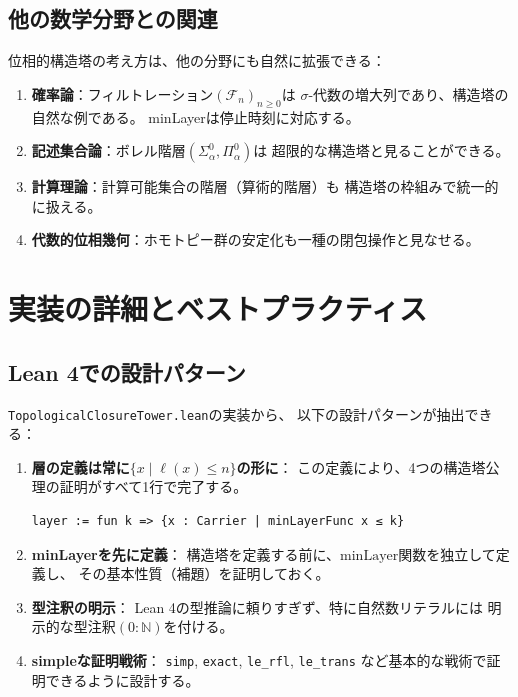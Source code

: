 \documentclass[a4paper,12pt]{ltjsarticle}
\theoremstyle{definition}
\begin{document}
\subsection{他の数学分野との関連}

位相的構造塔の考え方は、他の分野にも自然に拡張できる：

\begin{enumerate}
\item \textbf{確率論}：フィルトレーション$(\mathcal{F}_n)_{n \geq 0}$は
  $\sigma$-代数の増大列であり、構造塔の自然な例である。
  minLayerは停止時刻に対応する。

\item \textbf{記述集合論}：ボレル階層$(\Sigma^0_\alpha, \Pi^0_\alpha)$は
  超限的な構造塔と見ることができる。

\item \textbf{計算理論}：計算可能集合の階層（算術的階層）も
  構造塔の枠組みで統一的に扱える。

\item \textbf{代数的位相幾何}：ホモトピー群の安定化も一種の閉包操作と見なせる。
\end{enumerate}

\section{実装の詳細とベストプラクティス}

\subsection{Lean 4での設計パターン}

\texttt{TopologicalClosureTower.lean}の実装から、
以下の設計パターンが抽出できる：

\begin{enumerate}
\item \textbf{層の定義は常に}$\{x \mid \ell(x) \leq n\}$\textbf{の形に}：
  この定義により、4つの構造塔公理の証明がすべて1行で完了する。

\begin{lstlisting}[language=Lean]
layer := fun k => {x : Carrier | minLayerFunc x ≤ k}
\end{lstlisting}

\item \textbf{minLayerを先に定義}：
  構造塔を定義する前に、$\mathrm{minLayer}$関数を独立して定義し、
  その基本性質（補題）を証明しておく。

\item \textbf{型注釈の明示}：
  Lean 4の型推論に頼りすぎず、特に自然数リテラルには
  明示的な型注釈$(0 : \mathbb{N})$を付ける。

\item \textbf{simpleな証明戦術}：
  \texttt{simp}, \texttt{exact}, \texttt{le\_rfl}, \texttt{le\_trans}
  など基本的な戦術で証明できるように設計する。
\end{enumerate}
\end{document}
